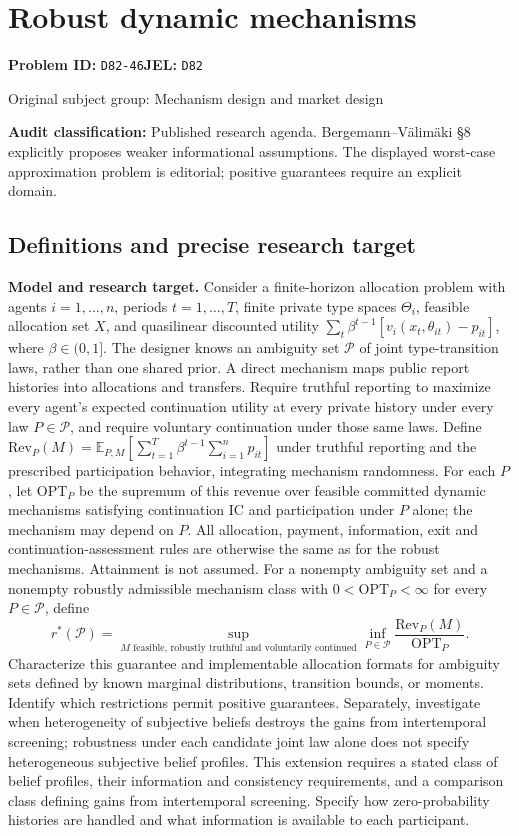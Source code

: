 \documentclass[11pt,a4paper]{article}
\begin{document}
\section*{Robust dynamic mechanisms}
\textbf{Problem ID:} \texttt{D82-46}\quad \textbf{JEL:} \texttt{D82}\par
\label{problem:OP-0290}
{\sffamily\small\color{muted}Original subject group: Mechanism design and market design\par}
\label{definitions:problem:30007572}
\textbf{Audit classification:} Published research agenda. Bergemann–Välimäki §8 explicitly proposes weaker informational assumptions. The displayed worst-case approximation problem is editorial; positive guarantees require an explicit domain.
\subsection*{Definitions and precise research target}
\textbf{Model and research target.} Consider a finite-horizon allocation problem with agents \(i=1,\ldots,n\), periods \(t=1,\ldots,T\), finite private type spaces \(\Theta_i\), feasible allocation set \(X\), and quasilinear discounted utility \(\sum_t\beta^{t-1}[v_i(x_t,\theta_{it})-p_{it}]\), where \(\beta\in(0,1]\). The designer knows an ambiguity set \(\mathcal P\) of joint type-transition laws, rather than one shared prior. A direct mechanism maps public report histories into allocations and transfers. Require truthful reporting to maximize every agent's expected continuation utility at every private history under every law \(P\in\mathcal P\), and require voluntary continuation under those same laws. Define \(\mathrm{Rev}_P(M)=\mathbb E_{P,M}[\sum_{t=1}^T\beta^{t-1}\sum_{i=1}^n p_{it}]\) under truthful reporting and the prescribed participation behavior, integrating mechanism randomness. For each \(P\), let \(\mathrm{OPT}_P\) be the supremum of this revenue over feasible committed dynamic mechanisms satisfying continuation IC and participation under \(P\) alone; the mechanism may depend on \(P\). All allocation, payment, information, exit and continuation-assessment rules are otherwise the same as for the robust mechanisms. Attainment is not assumed. For a nonempty ambiguity set and a nonempty robustly admissible mechanism class with \(0<\mathrm{OPT}_P<\infty\) for every \(P\in\mathcal P\), define
\[
 r^*(\mathcal P)=\sup_{M\text{ feasible, robustly truthful and voluntarily continued}}
 \inf_{P\in\mathcal P}\frac{\mathrm{Rev}_P(M)}{\mathrm{OPT}_P}.
\]
Characterize this guarantee and implementable allocation formats for ambiguity sets defined by known marginal distributions, transition bounds, or moments. Identify which restrictions permit positive guarantees. Separately, investigate when heterogeneity of subjective beliefs destroys the gains from intertemporal screening; robustness under each candidate joint law alone does not specify heterogeneous subjective belief profiles. This extension requires a stated class of belief profiles, their information and consistency requirements, and a comparison class defining gains from intertemporal screening. Specify how zero-probability histories are handled and what information is available to each participant.
\end{document}
